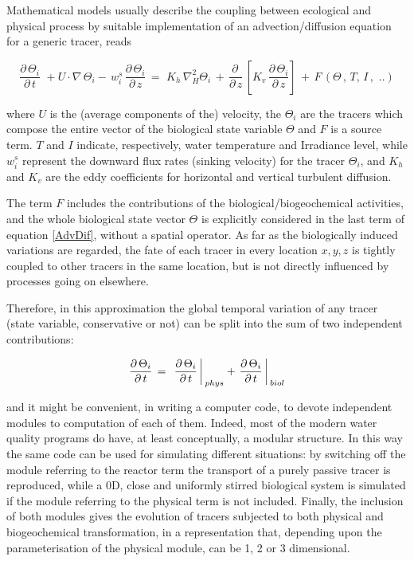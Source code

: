 Mathematical models usually describe the coupling between ecological 
and physical process by suitable implementation of an advection/diffusion 
equation for a generic tracer, reads 

\begin{equation} \label{AdvDif}
\frac{\partial \,\Theta _{i} }{\partial \,t} \,\,+U\cdot \nabla \,\Theta
_{i} -\,w^{s}_{i} \,\frac{\partial \,\Theta _{i} }{\partial \,z} \,=\,\,K_{h}
\,\nabla _{H}^{2} \Theta _{i} \,+\,\frac{\partial \,}{\partial \,z}
\,\left[ K_{v} \,\frac{\partial \,\Theta _{i} }{\partial \,z} \right]
\,+\,F\,\left( \Theta \,,\,T,\,I\,,\,\,..\right)
\end{equation}

where $U$ is the (average components of the) velocity, 
the $\Theta_{i}$ are the tracers which compose the entire 
vector of the biological state variable $\Theta$ and 
$F$ is a source term. $T$ and $I$ indicate, respectively, 
water temperature and Irradiance level, while $w^{s}_{i}$ represent 
the downward flux rates (sinking velocity) for the tracer 
$\Theta_{i}$, 
and $K_{h}$ and $K_{v}$ are the eddy coefficients for 
horizontal and vertical turbulent diffusion.

The term $F$ includes the contributions of the biological/biogeochemical 
activities, and the whole biological state vector $\Theta$ 
is explicitly considered in the last term of equation \ref{AdvDif}, without 
a spatial operator. As far as the biologically induced variations 
are regarded, the fate of each tracer in every location $x,y,z$ 
is tightly coupled to other tracers in the same location, but 
is not directly influenced by processes going on elsewhere. 

Therefore, in this approximation the global temporal variation 
of any tracer (state variable, conservative or not) can be split 
into the sum of two independent contributions: 

\begin{equation}
\frac{\partial \,\Theta _{i} }{\partial \,t} \,=\,\,\left. \frac{\partial
\,\Theta _{i} }{\partial \,t} \right\arrowvert_{phys} +\left. \frac{\partial
\,\Theta _{i} }{\partial \,t} \right\arrowvert_{biol}
\end{equation}

and it might be convenient, in writing a computer code, to devote 
independent modules to computation of each of them. Indeed, most 
of the modern water quality programs do have, at least conceptually, 
a modular structure. In this way the same code can be used for 
simulating different situations: by switching off the module 
referring to the reactor term the transport of a purely passive 
tracer is reproduced, while a 0D, close and uniformly stirred 
biological system is simulated if the module referring to the 
physical term is not included. Finally, the inclusion of both 
modules gives the evolution of tracers subjected to both physical 
and biogeochemical transformation, in a representation that, 
depending upon the parameterisation of the physical module, can 
be 1, 2 or 3 dimensional.

